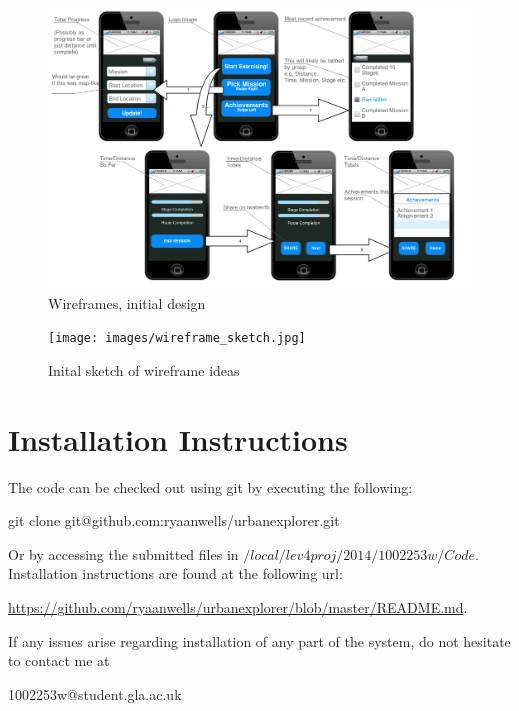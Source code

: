 \begin{figure}[H]
  \centering
  \includegraphics[width=\linewidth]{images/Wireframes.png}
  \caption{Wireframes, initial design}
  \label{wireframes_1}
\end{figure}
\begin{figure}[H]
  \centering
  \texttt{[image: images/wireframe\_sketch.jpg]}
  \caption{Inital sketch of wireframe ideas}
  \label{wireframes_2}
\end{figure}

\chapter{Installation Instructions}

The code can be checked out using git by executing the following:

git clone git@github.com:ryaanwells/urbanexplorer.git

Or by accessing the submitted files in $/local/lev4proj/2014/1002253w/Code$. Installation instructions are found at the following url:

\url{https://github.com/ryaanwells/urbanexplorer/blob/master/README.md}.


If any issues arise regarding installation of any part of the
system, do not hesitate to contact me at 

1002253w@student.gla.ac.uk
